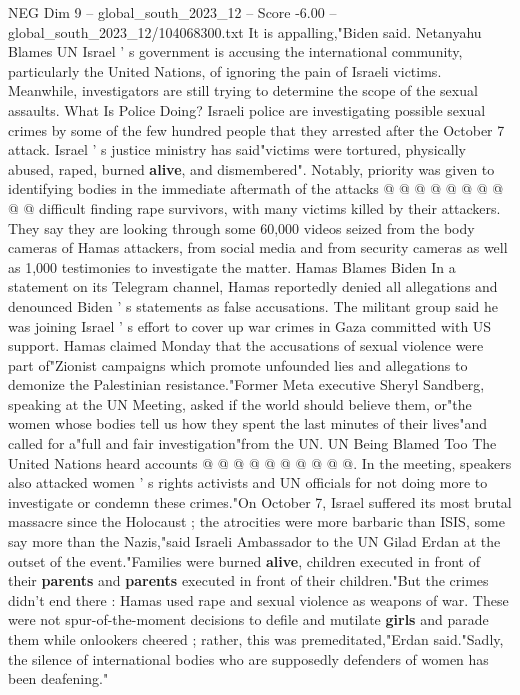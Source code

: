 \begin{textsample}{NEG Dim 9 – global\_south\_2023\_12 – Score -6.00 – global\_south\_2023\_12/104068300.txt}
It is appalling,"Biden said.
Netanyahu Blames UN Israel ' s government is accusing the international community, particularly the United Nations, of ignoring the pain of Israeli victims.
Meanwhile, investigators are still trying to determine the scope of the sexual assaults.
What Is Police Doing?
Israeli police are investigating possible sexual crimes by some of the few hundred people that they arrested after the October 7 attack.
Israel ' s justice ministry has said"victims were tortured, physically abused, raped, burned \textbf{alive}, and dismembered".
Notably, priority was given to identifying bodies in the immediate aftermath of the attacks @ @ @ @ @ @ @ @ @ @ difficult finding rape survivors, with many victims killed by their attackers.
They say they are looking through some 60,000 videos seized from the body cameras of Hamas attackers, from social media and from security cameras as well as 1,000 testimonies to investigate the matter.
Hamas Blames Biden In a statement on its Telegram channel, Hamas reportedly denied all allegations and denounced Biden ' s statements as false accusations.
The militant group said he was joining Israel ' s effort to cover up war crimes in Gaza committed with US support.
Hamas claimed Monday that the accusations of sexual violence were part of"Zionist campaigns which promote unfounded lies and allegations to demonize the Palestinian resistance."Former Meta executive Sheryl Sandberg, speaking at the UN Meeting, asked if the world should believe them, or"the women whose bodies tell us how they spent the last minutes of their lives"and called for a"full and fair investigation"from the UN.
UN Being Blamed Too The United Nations heard accounts @ @ @ @ @ @ @ @ @ @.
In the meeting, speakers also attacked women ' s rights activists and UN officials for not doing more to investigate or condemn these crimes."On October 7, Israel suffered its most brutal massacre since the Holocaust ; the atrocities were more barbaric than ISIS, some say more than the Nazis,"said Israeli Ambassador to the UN Gilad Erdan at the outset of the event."Families were burned \textbf{alive}, children executed in front of their \textbf{parents} and \textbf{parents} executed in front of their children."But the crimes didn't end there : Hamas used rape and sexual violence as weapons of war.
These were not spur-of-the-moment decisions to defile and mutilate \textbf{girls} and parade them while onlookers cheered ; rather, this was premeditated,"Erdan said."Sadly, the silence of international bodies who are supposedly defenders of women has been deafening."

\end{textsample}
